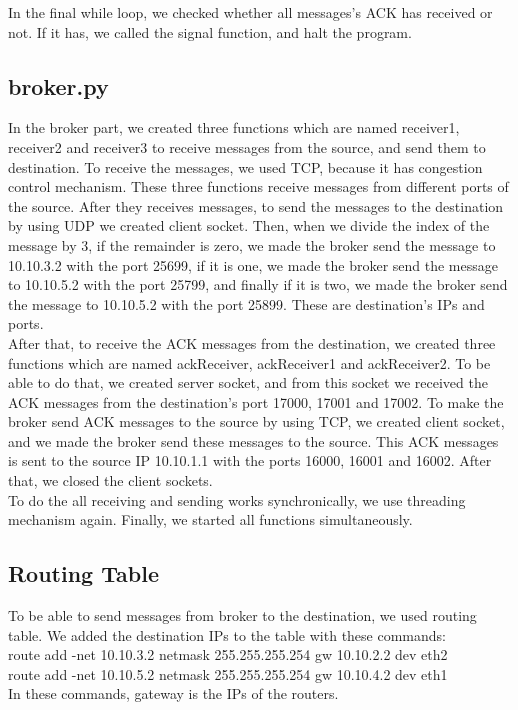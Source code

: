 \documentclass[conference]{IEEEtran}
\begin{document}
In the final while loop, we checked whether all messages's ACK has received or not. If it has, we called the signal function, and halt the program.

\subsection{broker.py}
In the broker part, we created three functions which are named receiver1, receiver2 and receiver3 to receive messages from the source, and send them to destination. To receive the messages, we used TCP, because it has congestion control mechanism. These three functions receive messages from different ports of the source. After they receives messages, to send the messages to the destination by using UDP we created client socket. Then, when we divide the index of the message by 3, if the remainder is zero, we made the broker send the message to 10.10.3.2 with the port 25699, if it is one, we made the broker send the message to 10.10.5.2 with the port 25799, and finally if it is two, we made the broker send the message to 10.10.5.2 with the port 25899. These are destination's IPs and ports. \\

After that, to receive the ACK messages from the destination, we created three functions which are named ackReceiver, ackReceiver1 and ackReceiver2. To be able to do that, we created server socket, and from this socket we received the ACK messages from the destination's port 17000, 17001 and 17002. To make the broker send ACK messages to the source by using TCP, we created client socket, and we made the broker send these messages to the source. This ACK messages is sent to the source IP 10.10.1.1 with the ports 16000, 16001 and 16002. After that, we closed the client sockets. \\

To do the all receiving and sending works synchronically, we use threading mechanism again. Finally, we started all functions simultaneously.

\subsection{Routing Table}
To be able to send messages from broker to the destination, we used routing table. We added the destination IPs to the table with these commands:\\
route add -net 10.10.3.2 netmask 255.255.255.254 gw 10.10.2.2 dev eth2\\
route add -net 10.10.5.2 netmask 255.255.255.254 gw 10.10.4.2 dev eth1 \\
In these commands, gateway is the IPs of the routers.\\
\end{document}
